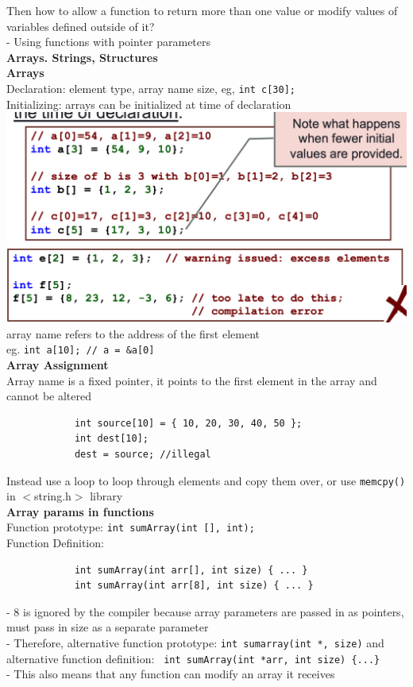 \documentclass[10pt, a4paper]{article}
\begin{document}
\begin{multicols*}{3}
		Then how to allow a function to return more than one value or modify values of variables defined outside of it?\\
		- Using functions with pointer parameters\\		
		
		{\normalsize\textbf{Arrays. Strings, Structures}}\\
		\textbf{Arrays}\\
		Declaration: element type, array name size, eg, \texttt{int c[30];}\\
		Initializing: arrays can be initialized at time of declaration\\
		\includegraphics[scale=0.25]{./assets/array}\\
		\includegraphics[scale=0.25]{./assets/array2}\\
		array name refers to the address of the first element \\
		eg. \texttt{int a[10]; // a = \&a[0]}\\
		
		\textbf{Array Assignment}\\
		Array name is a fixed pointer, it points to the first element in the array and cannot be altered
		\begin{verbatim}
			int source[10] = { 10, 20, 30, 40, 50 };
			int dest[10];
			dest = source; //illegal
		\end{verbatim}
		Instead use a loop to loop through elements and copy them over, or use \texttt{memcpy()} in $<$string.h$>$ library\\
		
		\textbf{Array params in functions}\\
		Function prototype: \texttt{int sumArray(int [], int);}\\
		Function Definition: 
		\begin{verbatim}
			int sumArray(int arr[], int size) { ... }
			int sumArray(int arr[8], int size) { ... }
		\end{verbatim}
		- 8 is ignored by the compiler because array parameters are passed in as pointers, must pass in size as a separate parameter\\
		- Therefore, alternative function prototype: \texttt{int sumarray(int *, size)} and alternative function definition: \texttt{ int sumArray(int *arr, int size) \{...\} }\\
		- This also means that any function can modify an array it receives\\
		

\end{multicols*}
\end{document}
